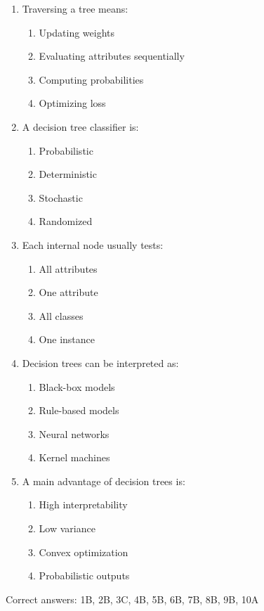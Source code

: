 \documentclass[3pt]{article}
\begin{document}
\begin{enumerate}
		\item Traversing a tree means:
		\begin{enumerate}
			\item Updating weights
			\item Evaluating attributes sequentially
			\item Computing probabilities
			\item Optimizing loss
		\end{enumerate}
		
		\item A decision tree classifier is:
		\begin{enumerate}
			\item Probabilistic
			\item Deterministic
			\item Stochastic
			\item Randomized
		\end{enumerate}
		
		\item Each internal node usually tests:
		\begin{enumerate}
			\item All attributes
			\item One attribute
			\item All classes
			\item One instance
		\end{enumerate}
		
		\item Decision trees can be interpreted as:
		\begin{enumerate}
			\item Black-box models
			\item Rule-based models
			\item Neural networks
			\item Kernel machines
		\end{enumerate}
		
		\item A main advantage of decision trees is:
		\begin{enumerate}
			\item High interpretability
			\item Low variance
			\item Convex optimization
			\item Probabilistic outputs
		\end{enumerate}
	\end{enumerate}
	
	Correct answers: 1B, 2B, 3C, 4B, 5B, 6B, 7B, 8B, 9B, 10A
	
\end{document}
